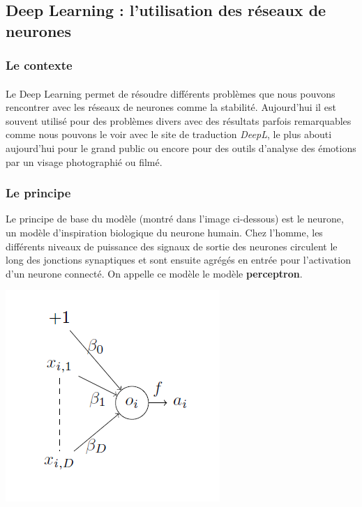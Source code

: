 \documentclass[14pt, openany]{article}
\begin{document}
\subsection{Deep Learning : l'utilisation des réseaux de neurones}

\subsubsection{Le contexte}
\paragraph{}
Le Deep Learning permet de résoudre différents problèmes que nous pouvons rencontrer avec les réseaux de neurones comme la stabilité. Aujourd'hui il est souvent utilisé pour des problèmes divers avec des résultats parfois remarquables comme nous pouvons le voir avec le site de traduction \textit{DeepL}, le plus abouti aujourd'hui pour le grand public ou encore pour des outils d'analyse des émotions par un visage photographié ou filmé.

\subsubsection{Le principe}
Le principe de base du modèle (montré dans l'image ci-dessous) est le neurone, un modèle d'inspiration biologique du neurone humain. Chez l'homme, les différents niveaux de puissance des signaux de sortie des neurones circulent le long des jonctions synaptiques et sont ensuite agrégés en entrée pour l'activation d'un neurone connecté. On appelle ce modèle le modèle \textbf{perceptron}.

\begin{center}
\includegraphics[scale=0.7]{Images/perceptron.png}
\end{center}
\end{document}
